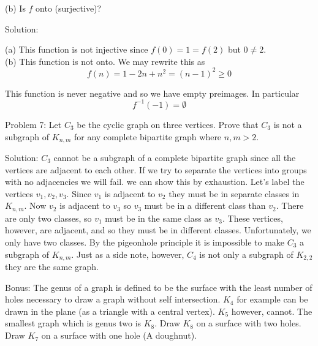\documentclass[16 pt]{amsart}
\theoremstyle{definition}
\theoremstyle{remark}
\numberwithin{equation}{subsection}
\begin{document}
(b) Is $f$ onto (surjective)?

\vspace{.5in}

Solution:

(a) This function is not injective since $f(0) = 1 = f(2)$ but $0\ne 2$.\\

(b) This function is not onto.   We may rewrite this as
\[
f(n) = 1 - 2n + n^2 = (n-1)^2 \ge 0
\]

This function is never negative and so we have empty preimages.  In particular
\[
f^{-1}(-1) = \emptyset
\]

\newpage

Problem 7: Let $C_3$ be the cyclic graph on three vertices.  Prove that $C_3$ is not a subgraph of $K_{n,m}$ for any complete bipartite graph where $n,m > 2$.

\vspace{.5in}

Solution:  $C_3$ cannot be a subgraph of a complete bipartite graph since all the vertices are adjacent to each other.  If we try to separate the vertices into groups with no adjacencies we will fail.  we can show this by exhaustion.  Let's label the vertices $v_1, v_2, v_3$.  Since $v_1$ is adjacent to $v_2$ they must be in separate classes in $K_{n,m}$.  Now $v_2$ is adjacent to $v_3$ so $v_3$ must be in a different class than $v_2$.  There are only two classes, so $v_1$ must be in the same class as $v_3$.  These vertices, however, are adjacent, and so they must be in different classes.  Unfortunately, we only have two classes.  By the pigeonhole principle it is impossible to make $C_3$ a subgraph of $K_{n,m}$.  Just as a side note, however, $C_4$ is not only a subgraph of $K_{2,2}$ they are the same graph.

\newpage

Bonus: The genus of a graph is defined to be the surface with the least number of holes necessary to draw a graph without self intersection.  $K_4$ for example can be drawn in the plane (as a triangle with a central vertex).  $K_5$ however, cannot.  The smallest graph which is genus two is $K_8$.  Draw $K_8$ on a surface with two holes.  Draw $K_7$ on a surface with one hole (A doughnut).
\end{document}
